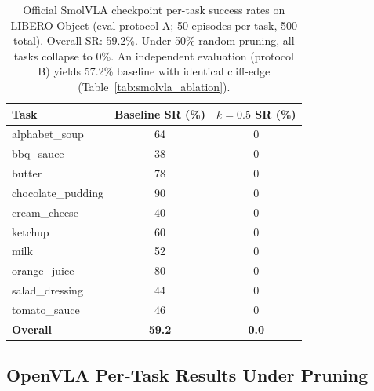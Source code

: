 \begin{table}[ht]
\centering
\small
\caption{Official SmolVLA checkpoint per-task success rates on LIBERO-Object (eval protocol A; 50 episodes per task, 500 total). Overall SR: 59.2\%. Under 50\% random pruning, all tasks collapse to 0\%. An independent evaluation (protocol B) yields 57.2\% baseline with identical cliff-edge (Table~\ref{tab:smolvla_ablation}).}
\label{tab:smolvla_official_pertask}
\begin{tabular}{lcc}
\toprule
Task & Baseline SR (\%) & $k{=}0.5$ SR (\%) \\
\midrule
alphabet\_soup & 64 & 0 \\
bbq\_sauce & 38 & 0 \\
butter & 78 & 0 \\
chocolate\_pudding & 90 & 0 \\
cream\_cheese & 40 & 0 \\
ketchup & 60 & 0 \\
milk & 52 & 0 \\
orange\_juice & 80 & 0 \\
salad\_dressing & 44 & 0 \\
tomato\_sauce & 46 & 0 \\
\midrule
\textbf{Overall} & \textbf{59.2} & \textbf{0.0} \\
\bottomrule
\end{tabular}
\end{table}

\subsection{OpenVLA Per-Task Results Under Pruning}

